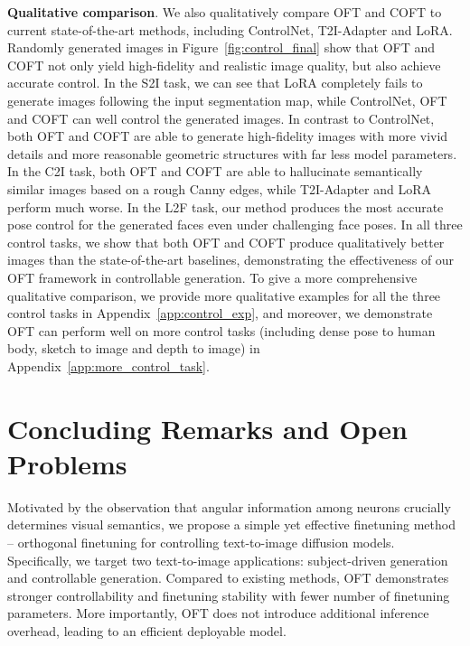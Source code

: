 \documentclass{article}
\begin{document}
\textbf{Qualitative comparison}. We also qualitatively compare OFT and COFT to current state-of-the-art methods, including ControlNet, T2I-Adapter and LoRA. Randomly generated images in Figure~\ref{fig:control_final} show that OFT and COFT not only yield high-fidelity and realistic image quality, but also achieve accurate control. In the S2I task, we can see that LoRA completely fails to generate images following the input segmentation map, while ControlNet, OFT and COFT can well control the generated images. In contrast to ControlNet, both OFT and COFT are able to generate high-fidelity images with more vivid details and more reasonable geometric structures with far less model parameters. In the C2I task, both OFT and COFT are able to hallucinate semantically similar images based on a rough Canny edges, while T2I-Adapter and LoRA perform much worse. In the L2F task, our method produces the most accurate pose control for the generated faces even under challenging face poses. In all three control tasks, we show that both OFT and COFT produce qualitatively better images than the state-of-the-art baselines, demonstrating the effectiveness of our OFT framework in controllable generation. To give a more comprehensive qualitative comparison, we provide more qualitative examples for all the three control tasks in Appendix~\ref{app:control_exp}, and moreover, we demonstrate OFT can perform well on more control tasks (including dense pose to human body, sketch to image and depth to image) in Appendix~\ref{app:more_control_task}.

\vspace{-2mm}
\section{Concluding Remarks and Open Problems}
\vspace{-1.5mm}


Motivated by the observation that angular information among neurons crucially determines visual semantics, we propose a simple yet effective finetuning method – orthogonal finetuning for controlling text-to-image diffusion models. Specifically, we target two text-to-image applications: subject-driven generation and controllable generation. Compared to existing methods, OFT demonstrates stronger controllability and finetuning stability with fewer number of finetuning parameters. More importantly, OFT does not introduce additional inference overhead, leading to an efficient deployable model.
\end{document}
